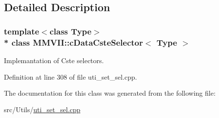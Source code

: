 \subsection{Detailed Description}
\subsubsection*{template$<$class Type$>$\\*
class M\+M\+V\+I\+I\+::c\+Data\+Cste\+Selector$<$ Type $>$}

Implemantation of Cste selectors. 

Definition at line 308 of file uti\+\_\+set\+\_\+sel.\+cpp.



The documentation for this class was generated from the following file\+:\begin{DoxyCompactItemize}
\item 
src/\+Utils/\hyperlink{uti__set__sel_8cpp}{uti\+\_\+set\+\_\+sel.\+cpp}\end{DoxyCompactItemize}
